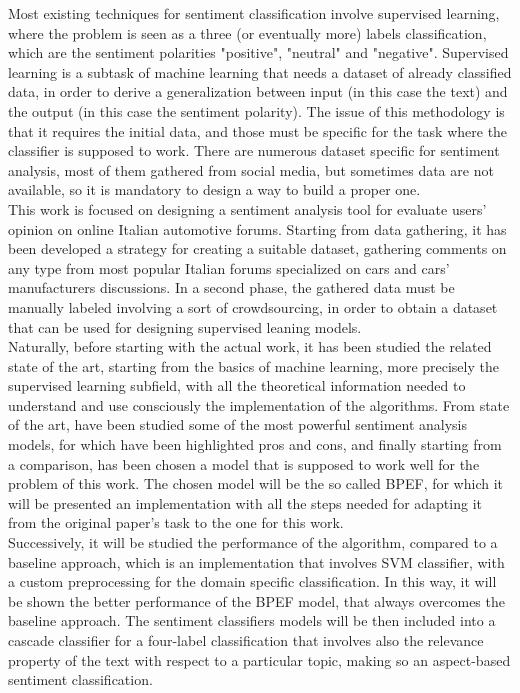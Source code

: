 Most existing techniques for sentiment classification involve supervised learning, where the problem is seen as a three (or eventually more) labels classification, which are the sentiment polarities "positive", "neutral" and "negative". Supervised learning is a subtask of machine learning that needs a dataset of already classified data, in order to derive a generalization between input (in this case the text) and the output (in this case the sentiment polarity). The issue of this methodology is that it requires the initial data, and those must be specific for the task where the classifier is supposed to work. There are numerous dataset specific for sentiment analysis, most of them gathered from social media, but sometimes data are not available, so it is mandatory to design a way to build a proper one.\\
This work is focused on designing a sentiment analysis tool for evaluate users' opinion on online Italian automotive forums. Starting from data gathering, it has been developed a strategy for creating a suitable dataset, gathering comments on any type from most popular Italian forums specialized on cars and cars' manufacturers discussions. In a second phase, the gathered data must be manually labeled involving a sort of crowdsourcing, in order to obtain a dataset that can be used for designing supervised leaning models.\\
Naturally, before starting with the actual work, it has been studied the related state of the art, starting from the basics of machine learning, more precisely the supervised learning subfield, with all the theoretical information needed to understand and use consciously the implementation of the algorithms. From state of the art, have been studied some of the most powerful sentiment analysis models, for which have been highlighted pros and cons, and finally starting from a comparison, has been chosen a model that is supposed to work well for the problem of this work. The chosen model will be the so called \ac{BPEF}, for which it will be presented an implementation with all the steps needed for adapting it from the original paper's task to the one for this work.\\
Successively, it will be studied the performance of the algorithm, compared to a baseline approach, which is an implementation that involves \acl{SVM} classifier, with a custom preprocessing for the domain specific classification. In this way, it will be shown the better performance of the \ac{BPEF} model, that always overcomes the baseline approach. The sentiment classifiers models will be then included into a cascade classifier for a four-label classification that involves also the relevance property of the text with respect to a particular topic, making so an aspect-based sentiment classification.\\
